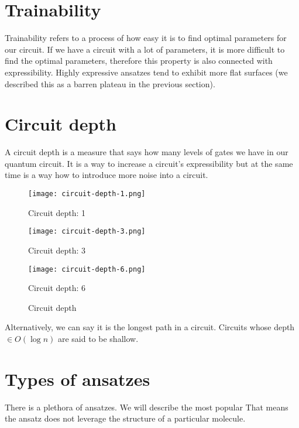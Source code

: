 \section{Trainability}
Trainability refers to a process of how easy it is to find optimal parameters for our circuit. If we have a circuit with a lot of parameters, it is more difficult to find the optimal parameters, therefore this property is also connected with expressibility. Highly expressive ansatzes tend to exhibit more flat surfaces (we described this as a barren plateau in the previous section). 

\section{Circuit depth}
A circuit depth is a measure that says how many levels of gates we have in our quantum circuit. It is a way to increase a circuit's expressibility but at the same time is a way how to introduce more noise into a circuit. 

\begin{figure}[H]
    \centering
    \begin{minipage}{0.2\linewidth}
        \centering
        \texttt{[image: circuit-depth-1.png]}
        \caption*{Circuit depth: 1}\label{fig:circuit_depth_1}
    \end{minipage}
    \hfill
    \begin{minipage}{0.3\linewidth}
        \centering
        \texttt{[image: circuit-depth-3.png]}
        \caption*{Circuit depth: 3}\label{fig:circuit_depth_3}
    \end{minipage}
    \hfill
    \begin{minipage}{0.45\linewidth}
        \centering
        \texttt{[image: circuit-depth-6.png]}
        \caption*{Circuit depth: 6}\label{fig:circuit_depth_6}
    \end{minipage}
    \caption{Circuit depth}
\end{figure}
Alternatively, we can say it is the longest path in a circuit. Circuits whose depth $\in O(\log n)$ are said to be shallow. 

\section{Types of ansatzes}
There is a plethora of ansatzes. We will describe the most popular 
That means the ansatz does not leverage the structure of a particular molecule. 
